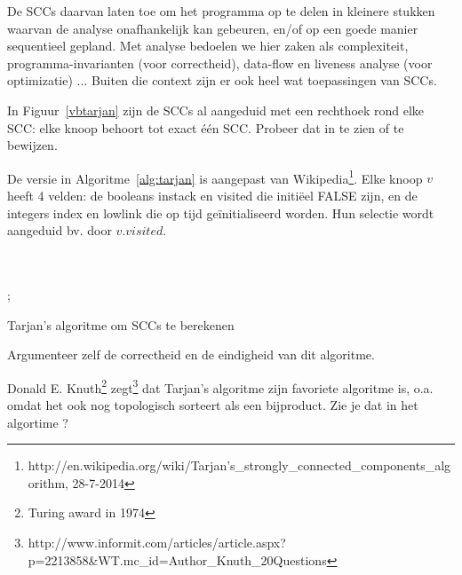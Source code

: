 De SCCs daarvan laten toe om het programma op te delen in kleinere
stukken waarvan de analyse onafhankelijk kan gebeuren, en/of op een
goede manier sequentieel gepland. Met analyse bedoelen we hier zaken
als complexiteit, programma-invarianten (voor correctheid), data-flow
en liveness analyse (voor optimizatie) ... Buiten die context zijn er
ook heel wat toepassingen van SCCs.

In Figuur~\ref{vbtarjan} zijn de SCCs al aangeduid met een rechthoek
rond elke SCC: elke knoop behoort tot exact \'{e}\'{e}n SCC. Probeer
dat in te zien of te bewijzen.

De versie in Algoritme~\ref{alg:tarjan} is aangepast van Wikipedia\footnote{
http://en.wikipedia.org/wiki/Tarjan's\_strongly\_connected\_components\_algorithm,
 28-7-2014}.
%
Elke knoop $v$ heeft 4 velden: de booleans instack en visited die
initi\"eel FALSE zijn, en de integers index en lowlink die op tijd
ge\"{i}nitialiseerd worden.  Hun selectie wordt aangeduid bv. door
$v.visited$.

\begin{algorithm}[h]
\begin{algorithmic}

    \EndFor
\EndFunction
~\\
~\\
       ;
       \EndIf
\EndFor
    \Repeat
    \EndIf
\EndFunction

  \end{algorithmic}
  \caption{Tarjan's algoritme om SCCs te berekenen}
  \label{alg:tarjan}
\end{algorithm}


Argumenteer zelf de correctheid en de eindigheid van dit algoritme.

Donald E. Knuth\footnote{Turing award in 1974}
zegt\footnote{http://www.informit.com/articles/article.aspx?p=2213858\&WT.mc\_id=Author\_Knuth\_20Questions}
dat Tarjan's algoritme zijn favoriete algoritme is, o.a. omdat het ook
nog topologisch sorteert als een bijproduct. Zie je dat in het
algortime ?

